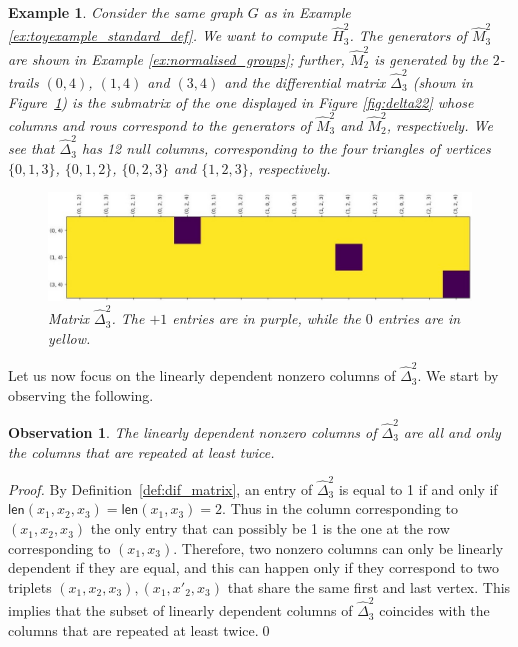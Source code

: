 \documentclass{article}
\newtheorem{example}{Example}
\newcommand{\len}{\textsf{len}}
\newcommand{\giuliaB}[1]{\todo[color=yellow!40]{#1}}
\newcommand{\giuliaM}[1]{\todo[color=blue!40]{#1}}
\newtheorem{observation}{Observation}
\begin{document}
	
	\begin{example}\label{ex:triangles}
		Consider the same graph $G$ as in Example \ref{ex:toyexample_standard_def}.
		We want to compute $\widehat{H}_3^2$.
		The generators of $\widehat{M}_3^2$ are shown in Example \ref{ex:normalised_groups};
		further, $\widehat{M}_2^2$ is generated by the $2$-trails $(0,4)$, $(1,4)$ and $(3,4)$ and the differential matrix $\widehat{\Delta}_3^2$ (shown in Figure~\ref{fig:normalized_delta22}) is the submatrix of the one displayed in Figure \ref{fig:delta22} whose columns and rows correspond to the generators of $\widehat{M}_3^2$ and $\widehat{M}_2^2$, respectively.
		We see that $\widehat{\Delta}_3^2$ has 12 null columns, corresponding to the four triangles of vertices $\{0, 1, 3\}$, $\{0, 1, 2\}$, $\{0, 2, 3\}$ and $\{1, 2, 3\}$, respectively.
		\begin{figure}
			\centering
			\includegraphics[width=\textwidth]{images/normalized_matrix_example.jpg}
			\caption{Matrix $\widehat{\Delta}_3^2$. The $+1$ entries are in purple, while the $0$ entries are in yellow.}\label{fig:normalized_delta22}
		\end{figure}
	\end{example}
	
	Let us now focus on the linearly dependent nonzero columns of $\widehat{\Delta}_3^2$. 
	We start by observing the following.
	
	\begin{observation}\label{obs:repeated_columns}
		The linearly dependent nonzero columns of $\widehat{\Delta}_3^2$ are all and only the columns that are repeated at least twice.
	\end{observation}
	\begin{proof}
		By Definition~\ref{def:dif_matrix}, an entry of $\widehat{\Delta}_3^2$ is equal to 1 if and only if $\len(x_1,x_2,x_3)=\len(x_1,x_3)=2$.
		Thus in the column corresponding to $(x_1,x_2,x_3)$ the only entry that can possibly be 1 is the one at the row corresponding to $(x_1,x_3)$.
		Therefore, two nonzero columns can only be linearly dependent if they are equal, and this can happen only if they correspond to two triplets $(x_1,x_2,x_3),(x_1,x'_2,x_3)$ that share the same first and last vertex.
		This implies that the subset of linearly dependent columns of $\widehat{\Delta}_3^2$ coincides with the columns that are repeated at least twice.\qed
	\end{proof}
	
\end{document}
